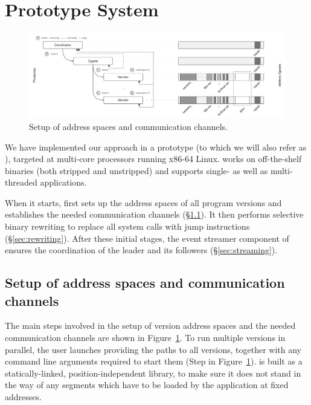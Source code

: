 \section{\nx Prototype System}
\label{sec:prototype}


\begin{figure}[t]
  \begin{center}
    \includegraphics[width=\textwidth]{efficient-execution/figures/address-space}
    \caption{Setup of address spaces and communication channels.}
    \label{fig:setup}
  \end{center}
\end{figure}


We have implemented our approach in a prototype (to which we will also
refer as \nx), targeted at multi-core processors running x86-64 Linux.
\varan works on off-the-shelf binaries (both stripped and unstripped)
and supports single- as well as multi-threaded applications.

When it starts, \nx first sets up the address spaces of all program
versions and establishes the needed communication channels
(\S\ref{sec:setup}).  It then performs selective binary rewriting to
replace all system calls with  jump instructions
(\S\ref{sec:rewriting}).  After these initial stages, the event
streamer component of \nx ensures the coordination of the leader and
its followers (\S\ref{sec:streaming}).


\subsection{Setup of address spaces and communication channels}
\label{sec:setup}

The main steps involved in the setup of version address spaces and the
needed communication channels are shown in Figure~\ref{fig:setup}.  To
run multiple versions in parallel, the user launches \nx providing the
paths to all versions, together with any command line arguments required
to start them (Step  in Figure~\ref{fig:setup}). \nx is built
as a statically-linked, position-independent library, to make sure it
does not stand in the way of any segments which have to be loaded by the
application at fixed addresses.

